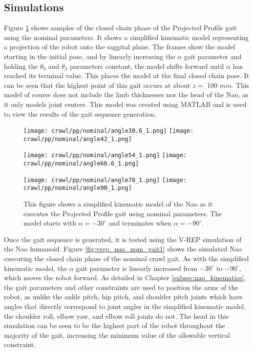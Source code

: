 \subsection{Simulations}
Figure \ref{fig:pp_nom_gait1} shows samples of the closed chain phase of the Projected
Profile gait using the nominal parameters. It shows a simplified kinematic model
representing a projection of the robot onto the saggital plane. The frames show the
model starting in the initial pose, and by linearly increasing the $\alpha$ gait
parameter and holding the $\theta_3$ and $\theta_4$ parameters constant, the model
shifts forward until $\alpha$ has reached its terminal value. This places the model
at the final closed chain pose. It can be seen that the highest point of this gait occurs
at about $z =$ 100 $mm$. This model of course does not include the limb thicknesses nor
the head of the Nao, as it only models joint centers. This model was created using MATLAB
and is used to view the results of the gait sequence generation.

\begin{figure}
  \centerline{
    \texttt{[image: crawl/pp/nominal/angle30.6\_1.png]}
    \texttt{[image: crawl/pp/nominal/angle42\_1.png]}
  }
  \centerline{
    \texttt{[image: crawl/pp/nominal/angle54\_1.png]}
    \texttt{[image: crawl/pp/nominal/angle66.6\_1.png]}
  }
  \centerline{
    \texttt{[image: crawl/pp/nominal/angle78\_1.png]}
    \texttt{[image: crawl/pp/nominal/angle90\_1.png]}
  }
  \caption{This figure shows a simplified kinematic model of the Nao as it executes
           the Projected Profile gait using nominal parameters. The model starts with
           $\alpha = -30^\circ$ and terminates when $\alpha = -90^\circ$.}
  \label{fig:pp_nom_gait1}
\end{figure}


Once the gait sequence is generated, it is tested using the V-REP simulation of the
Nao humanoid. Figure \ref{fig:vrep_nao_nom_gait1} shows the simulated Nao executing
the closed chain phase of the nominal crawl gait. As with the simplified kinematic
model, the $\alpha$ gait parameter is linearly increased from $-30^\circ$ to $-90^\circ$,
which moves the robot forward. As detailed in Chapter \ref{subsec:nao_kinematics}, the
gait parameters and other constraints are used to position the arms of the robot, as unlike
the ankle pitch, hip pitch, and shoulder pitch joints which have angles that directly correspond to
joint angles in the simplified kinematic model, the shoulder roll, elbow yaw, and elbow roll joints
do not. The head in this simulation can be seen to be the highest part of the robot
throughout the majority of the gait, increasing the minimum value of the allowable
vertical constraint.

